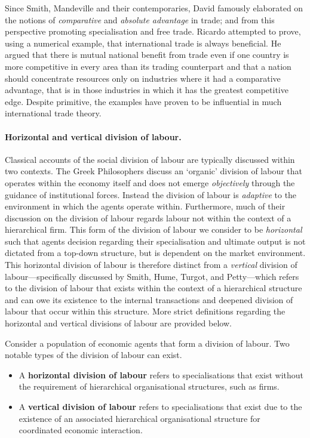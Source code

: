 Since Smith, Mandeville and their contemporaries, David \citet{Ricardo1817} famously elaborated on the notions of \emph{comparative} and \emph{absolute advantage} in trade; and from this perspective promoting specialisation and free trade. Ricardo attempted to prove, using a numerical example, that international trade is always beneficial. He argued that there is mutual national benefit from trade even if one country is more competitive in every area than its trading counterpart and that a nation should concentrate resources only on industries where it had a comparative advantage, that is in those industries in which it has the greatest competitive edge. Despite primitive, the examples have proven to be influential in much international trade theory.

\paragraph{Horizontal and vertical division of labour.}

Classical accounts of the social division of labour are typically discussed within two contexts. The Greek Philosophers discuss an `organic' division of labour that operates within the economy itself and does not emerge \emph{objectively} through the guidance of institutional forces. Instead the division of labour is \emph{adaptive} to the environment in which the agents operate within. Furthermore, much of their discussion on the division of labour regards labour not within the context of a hierarchical firm. This form of the division of labour we consider to be \emph{horizontal} such that agents decision regarding their specialisation and ultimate output is not dictated from a top-down structure, but is dependent on the market environment. This horizontal division of labour is therefore distinct from a \emph{vertical} division of labour---specifically discussed by Smith, Hume, Turgot, and Petty---which refers to the division of labour that exists within the context of a hierarchical structure and can owe its existence to the internal transactions and deepened division of labour that occur within this structure. More strict definitions regarding the horizontal and vertical divisions of labour are provided below.

\begin{definition}
Consider a population of economic agents that form a division of labour. Two notable types of the division of labour can exist.
\begin{itemize}
\item A \textbf{horizontal division of labour} refers to specialisations that exist without the requirement of hierarchical organisational structures, such as firms.
\item A \textbf{vertical division of labour} refers to specialisations that exist due to the existence of an associated hierarchical organisational structure for coordinated economic interaction.
\end{itemize}
\end{definition}

